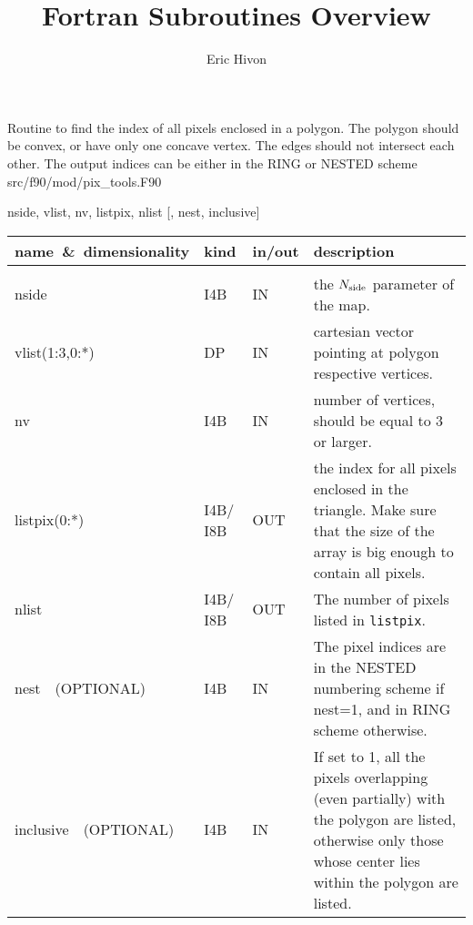 
\sloppy


\title{\healpix Fortran Subroutines Overview}
 \section[query\_polygon]{ }
\label{sub:query_polygon}
\author{Eric Hivon}

\begin{facility}
{Routine to find the index of all pixels enclosed in a polygon. The polygon should be convex, 
or have only one concave vertex. The edges should not intersect each other. 
The output indices can be either in the RING or NESTED scheme} 
{src/f90/mod/pix\_tools.F90}
\end{facility}

\begin{f90format}
{nside, vlist, nv, listpix, nlist [, nest, inclusive]}
\end{f90format}

\begin{arguments}
{
\begin{tabular}{p{0.25\hsize} p{0.05\hsize} p{0.1\hsize} p{0.5\hsize}} \hline  
\textbf{name~\&~dimensionality} & \textbf{kind} & \textbf{in/out} & \textbf{description} \\ \hline
                   &   &   &                           \\ %
nside & I4B & IN & the ${N_{\rm side}}$ parameter of the map. \\
vlist(1:3,0:*) & DP & IN & cartesian vector pointing at polygon
                   respective vertices. \\
nv & I4B & IN & number of vertices, should be equal to 3 or larger. \\
listpix(0:*) & I4B/ I8B & OUT & the index for all pixels enclosed in the triangle. Make sure that the size of the array is big enough to contain all pixels. \\ 
nlist & I4B/ I8B & OUT & The number of pixels listed in {\tt listpix}. \\
nest\ \ (OPTIONAL) & I4B & IN &  The pixel indices are in the NESTED numbering scheme if nest=1, and in RING scheme otherwise. \\
inclusive\ \ (OPTIONAL) & I4B & IN & If set to 1, all the pixels overlapping
                   (even partially)
                   with the polygon are listed, otherwise only those whose
                   center lies within the polygon are listed. \\
\end{tabular}
}
\end{arguments}


